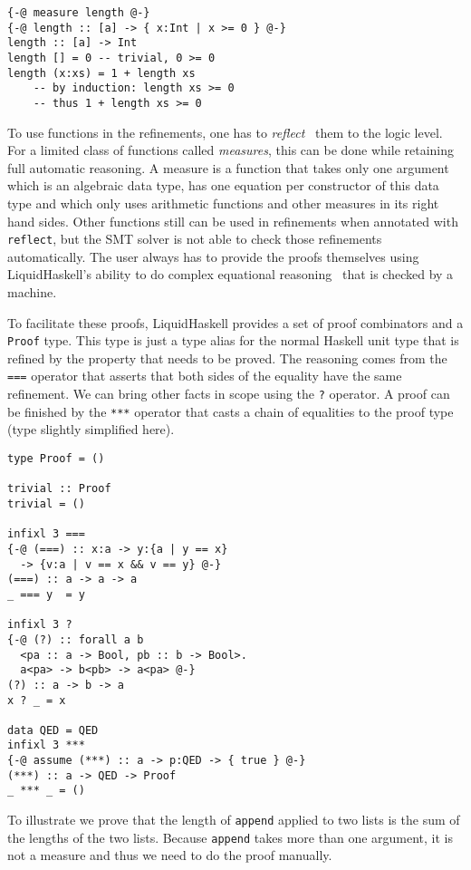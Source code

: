 \documentclass[sigplan,screen,review,anonymous]{acmart}
\begin{document}
\begin{lstlisting}
{-@ measure length @-}
{-@ length :: [a] -> { x:Int | x >= 0 } @-}
length :: [a] -> Int
length [] = 0 -- trivial, 0 >= 0
length (x:xs) = 1 + length xs
    -- by induction: length xs >= 0
    -- thus 1 + length xs >= 0
\end{lstlisting}

To use functions in the refinements, one has to \textit{reflect}~\cite{reflection} them to the logic level. For a limited class of functions called \textit{measures}, this can be done while retaining full automatic reasoning. A measure is a function that takes only one argument which is an algebraic data type, has one equation per constructor of this data type and which only uses arithmetic functions and other measures in its right hand sides. Other functions still can be used in refinements when annotated with \texttt{reflect}, but the SMT solver is not able to check those refinements automatically. The user always has to provide the proofs themselves using LiquidHaskell's ability to do complex equational reasoning~\cite{tpfa} that is checked by a machine.

To facilitate these proofs, LiquidHaskell provides a set of proof combinators and a \texttt{Proof} type. This type is just a type alias for the normal Haskell unit type that is refined by the property that needs to be proved. The reasoning comes from the \texttt{===} operator that asserts that both sides of the equality have the same refinement. We can bring other facts in scope using the \texttt{?} operator. A proof can be finished by the \texttt{***} operator that casts a chain of equalities to the proof type (type slightly simplified here).

\begin{lstlisting}
type Proof = ()

trivial :: Proof
trivial = ()

infixl 3 ===
{-@ (===) :: x:a -> y:{a | y == x}
  -> {v:a | v == x && v == y} @-}
(===) :: a -> a -> a
_ === y  = y

infixl 3 ?
{-@ (?) :: forall a b
  <pa :: a -> Bool, pb :: b -> Bool>.
  a<pa> -> b<pb> -> a<pa> @-}
(?) :: a -> b -> a 
x ? _ = x 

data QED = QED
infixl 3 ***
{-@ assume (***) :: a -> p:QED -> { true } @-}
(***) :: a -> QED -> Proof
_ *** _ = ()
\end{lstlisting}

To illustrate we prove that the length of \texttt{append} applied to two lists is the sum of the lengths of the two lists. Because \texttt{append} takes more than one argument, it is not a measure and thus we need to do the proof manually.
\end{document}
